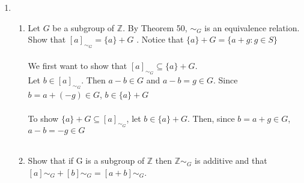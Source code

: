 \documentclass[11pt]{article}
\begin{document}
\begin{enumerate}
\newpage %
\item
\begin{enumerate}
\item Let $G$ be a subgroup of $\mathbb{Z}$. By Theorem 50, $\sim_G$ is an equivalence relation. Show that $[a]_{\sim_G} = \{a\}+G$ . Notice that $\{a\} + G = \{a + g : g \in S\}$
\\
\\
We first want to show that $[a]_{\sim_G} \subseteq \{a\} + G$.\\
Let $b \in [a]_{\sim_G}$.  Then $a - b \in G$ and $a - b = g \in G$.  Since $b = a + (-g) \in G$, $b \in \{a\} + G$\\
\\
To show $\{a\} + G \subseteq [a]_{\sim_G}$, let $b \in \{a\} + G$.  Then, since $b = a + g \in G$, $a - b = -g \in G$
\\
\\

\item Show that if G is a subgroup of $\mathbb{Z}$ then $\mathbb{Z}\sim_G$ is additive and that $[a]\sim_G + [b]\sim_G = [a + b]\sim_G$.
\\
\\
\\
\\
\\
\\
\\

\end{enumerate}


\end{enumerate} %
\end{document}
